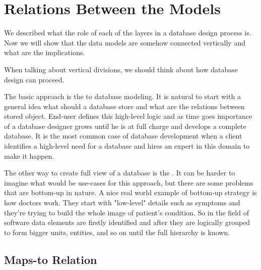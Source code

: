 \section{Relations Between the Models}

We described what the role of each of the layers in a database design process is.
Now we will show that the data models are somehow connected vertically and what are the implications.

When talking about vertical divisions, we should think about how database design can proceed.

The basic approach is the  to database modeling.
It is natural to start with a general idea what should a database store and what are the relations between stored object. 
End-user defines this high-level logic and as time goes importance of a database designer grows until he is at full charge and develops a complete database. It is the most common case of database development when a client identifies a high-level need for a database and hires an expert in this domain to make it happen.

The other way to create full view of a database is the . It can be harder to imagine what would be use-cases for this approach, but there are some problems that are bottom-up in nature. A nice real world example of bottom-up strategy is how doctors work. 
They start with "low-level" details such as symptoms and they're trying to build the whole image of patient's condition. So in the field of software data elements are firstly identified and after they are logically grouped to form bigger units, entities, and so on until the full hierarchy is known.

\subsection{Maps-to Relation}

